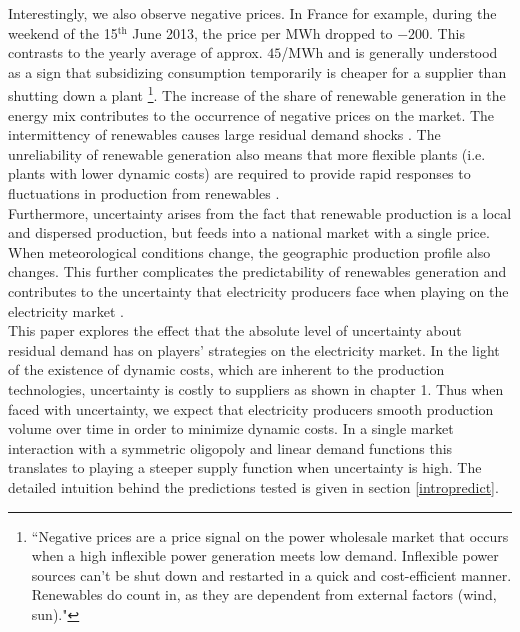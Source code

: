 Interestingly, we also observe negative prices. In France for example, during the weekend of the 15$^\text{th}$ June 2013, the price per MWh dropped to $-200$\EUR{}. This contrasts to the yearly average of approx. $ 45$\EUR{}/MWh and is generally understood as a sign that subsidizing consumption temporarily is cheaper for a supplier than shutting down a plant \cite{epexwebsite1}\footnote{``Negative prices are a price signal on the power wholesale market that occurs when a high inflexible power generation meets low demand. Inflexible power sources can’t be shut down and restarted in a quick and cost-efficient manner. Renewables do count in, as they are dependent from external factors (wind, sun)."}.  The increase of the share of renewable generation in the energy mix contributes to the occurrence of negative prices on the market. 
The intermittency of renewables causes large residual demand shocks \cite{epexwebsite1}. The unreliability of renewable generation also means that more flexible plants (i.e. plants with lower dynamic costs) are required to provide rapid responses to fluctuations in production from renewables \cite{ren2013renewables}. \\

Furthermore, uncertainty arises from the fact that renewable production is a local and dispersed production, but feeds into a national market with a single price. When meteorological conditions change, the geographic production profile also changes. This further complicates the predictability of renewables generation and contributes to the uncertainty that electricity producers face when playing %
on the electricity %
market \cite{meibom2009operational}.\\

This paper explores the effect that the absolute level of uncertainty about residual demand has on players' strategies on the electricity market. In the light of the existence of dynamic costs, which are inherent to the production technologies, uncertainty is costly to suppliers as shown in chapter 1. Thus when faced with uncertainty, we expect that electricity producers smooth production volume over time in order to minimize dynamic costs. In a single market interaction with a symmetric oligopoly and linear demand functions this translates to playing a steeper supply function when uncertainty is high. The detailed intuition behind the predictions tested is given in section \ref{intropredict}. 

